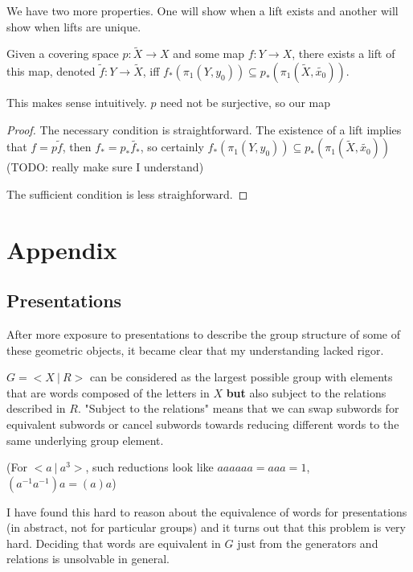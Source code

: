 \documentclass[10pt]{article}
\begin{document}
We have two more properties. One will show when a lift exists and another will
show when lifts are unique.

\begin{proposition}
	Given a covering space $p: \tilde{X} \to X$ and some map $f: Y \to X$, there
	exists a lift of this map, denoted $\tilde{f}: Y \to \tilde{X}$, iff $f_*(\pi_1(Y, y_0)) \subseteq
	p_*(\pi_1(\tilde{X}, \tilde{x_0}))$.
\end{proposition}

This makes sense intuitively. $p$ need not be surjective, so our map 


\begin{proof}
	The necessary condition is straightforward. The existence of a lift implies
	that $f = p\tilde{f}$, then $f_* = p_*\tilde{f_*}$, so certainly
	$f_*(\pi_1(Y, y_0)) \subseteq p_*(\pi_1(\tilde{X}, \tilde{x_0}))$ (TODO:
	really make sure I understand)

	The sufficient condition is less straighforward.
\end{proof}


\section{Appendix}

\subsection{Presentations}

After more exposure to presentations to describe the group structure of some of
these geometric objects, it became clear that my understanding lacked rigor.

$G = <X~|~R>$ can be considered as the largest possible group with elements
that are words composed of the letters in $X$ \textbf{but} also subject to the
relations described in $R$. "Subject to the relations" means that we can swap
subwords for equivalent subwords or cancel subwords towards reducing different
words to the same underlying group element. 

(For $<a ~|~a^3>$, such reductions look like $aaaaaa = aaa = 1$, $(a^{-1}a^{-1})a = (a)a$)

I have found this hard to reason about the equivalence of words for
presentations (in abstract, not for particular groups) and it turns out that
this problem is very hard. Deciding that words are equivalent in $G$ just from
the generators and relations is unsolvable in general.
\end{document}
